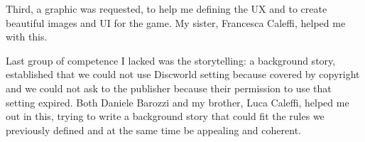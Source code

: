		Third, a graphic was requested, to help me defining the UX and to create beautiful images and UI for the game. My sister, Francesca Caleffi, helped me with this.
		
		Last group of competence I lacked was the storytelling: a background story, established that we could not use Discworld setting because covered by copyright and we could not ask to the publisher because their permission to use that setting expired. Both Daniele Barozzi and my brother, Luca Caleffi, helped me out in this, trying to write a background story that could fit the rules we previously defined and at the same time be appealing and coherent.